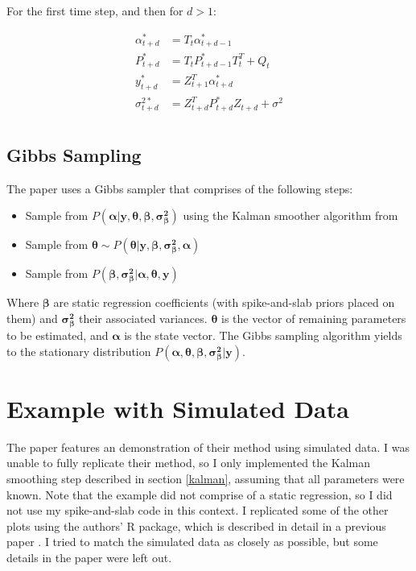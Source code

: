 \documentclass[12pt]{article}
\begin{document}
For the first time step, and then for $d > 1$:


\begin{align*}
    \alpha^*_{t + d}& =  T_{t} \alpha^*_{t + d -1} \\
    P^*_{t + d}& =  T_{t} P^*_{t + d - 1} T_t^T + Q_t\\
    y^*_{t + d} &= Z_{t + 1}^T \alpha^*_{t + d}\\
    \sigma^{2*}_{t + d} &= Z_{t + d}^T P^*_{t + d}Z_{t + d} + \sigma^2\\
\end{align*}


\subsection{Gibbs Sampling}
The paper uses a Gibbs sampler that comprises of the following steps:
\begin{itemize}
    \item Sample from $P(\boldsymbol{\alpha}|\boldsymbol{y}, \boldsymbol{\theta}, \boldsymbol{\beta},  \boldsymbol{\sigma^2_{\beta}})$ using the Kalman smoother algorithm from \cite{durbin2002simple}
    \item Sample from $\boldsymbol{\theta}\sim P(\boldsymbol{\theta}|\boldsymbol{y}, \boldsymbol{\beta},  \boldsymbol{\sigma^2_{\beta}}, \boldsymbol{\alpha})$
    \item Sample from $P(\boldsymbol{\beta},\boldsymbol{\sigma^2_{\beta}}|\boldsymbol{\alpha}, \boldsymbol{\theta}, \boldsymbol{y})$
\end{itemize}

Where $\boldsymbol{\beta}$ are static regression coefficients (with spike-and-slab priors placed on them) and $\boldsymbol{\sigma^2_\beta}$ their associated variances. $\boldsymbol{\theta}$ is the vector of remaining parameters to be estimated, and $\boldsymbol{\alpha}$ is the state vector. The Gibbs sampling algorithm yields to the stationary distribution $P(\boldsymbol{\alpha}, \boldsymbol{\theta}, \boldsymbol{\beta},  \boldsymbol{\sigma^2_{\beta}}|\boldsymbol{y})$.

\section{Example with Simulated Data}\label{toy}
The paper features an demonstration of their method using simulated data. I was unable to fully replicate their method, so I only implemented the Kalman smoothing step described in section \ref{kalman}, assuming that all parameters were known. Note that the example did not comprise of a static regression, so I did not use my spike-and-slab code in this context. I replicated some of the other plots using the authors' R package, which is described in detail in a previous paper \cite{scott2014predicting}. I tried to match the simulated data as closely as possible, but some details in the paper were left out.
\end{document}
